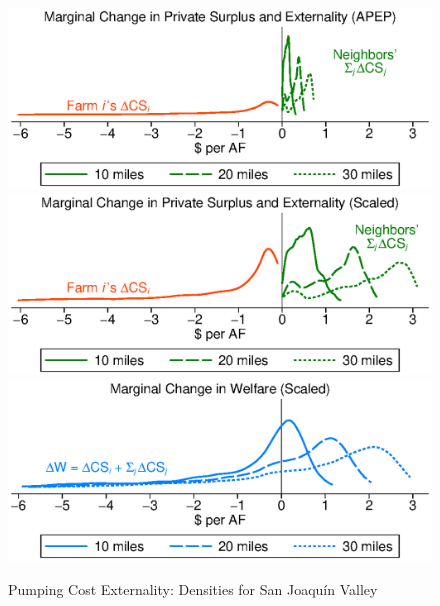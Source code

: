 \vspace{35mm}
\begin{figure}[h!]\centering
\captionsetup{width=\textwidth}
\caption{Pumping Cost Externality: Densities for San Joaqu\'{i}n Valley}
\label{fig:dwl_densities}
\vspace{-2mm}
{\includegraphics[trim={0 22mm 0 21mm}, clip, width=.84\textwidth]{figures/ext_dcs_j.eps}}\\
\vspace{2mm}
{\includegraphics[trim={0 22mm 0 18mm}, clip, width=.84\textwidth]{figures/ext_dcs_j_scaled.eps}}\\
\vspace{2mm}
{\includegraphics[trim={0 22mm 0 18mm}, clip, width=.84\textwidth]{figures/ext_dw_scaled.eps}}\\
\vspace{2mm}
\captionsetup{width=\textwidth}

\end{figure}
